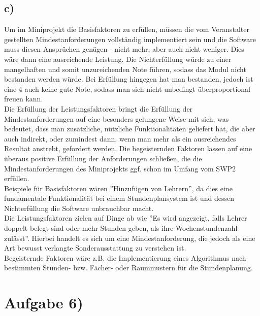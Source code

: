 \documentclass{swp1}
\begin{document}
\subsection*{c)}
Um im Miniprojekt die Basisfaktoren zu erfüllen, müssen die vom Veranstalter gestellten Mindestanforderungen vollständig implementiert sein und die Software muss diesen Ansprüchen genügen - nicht mehr, aber auch nicht weniger. Dies wäre dann eine ausreichende Leistung. Die Nichterfüllung würde zu einer mangelhaften und somit unzureichenden Note führen, sodass das Modul nicht bestanden werden würde. Bei Erfüllung hingegen hat man bestanden, jedoch ist eine 4 auch keine gute Note, sodass man sich nicht unbedingt überproportional freuen kann.\\
Die Erfüllung der Leistungsfaktoren bringt die Erfüllung der Mindestanforderungen auf eine besonders gelungene Weise mit sich, was bedeutet, dass man zusätzliche, nützliche Funktionalitäten geliefert hat, die aber auch indirekt, oder zumindest dann, wenn man mehr als ein ausreichendes Resultat anstrebt, gefordert werden. Die begeisternden Faktoren lassen auf eine überaus positive Erfüllung der Anforderungen schließen, die die Mindestanforderungen des Miniprojekts ggf. schon im Umfang vom SWP2 erfüllen. \\
Beispiele für Basisfaktoren wären ''Hinzufügen von Lehrern'', da dies eine fundamentale Funktionalität bei einem Stundenplansystem ist und dessen Nichterfüllung die Software unbrauchbar macht. \\
Die Leistungsfaktoren zielen auf Dinge ab wie ''Es wird angezeigt, falls Lehrer doppelt belegt sind oder mehr Stunden geben, als ihre Wochenstundenzahl zulässt''. Hierbei handelt es sich um eine Mindestanforderung, die jedoch als eine Art bewusst verlangte Sonderausstattung zu verstehen ist. \\
Begeisternde Faktoren wäre z.B. die Implementierung eines Algorithmus nach bestimmten Stunden- bzw. Fächer- oder Raummustern für die Stundenplanung. 


\section*{Aufgabe 6)}
\end{document}
